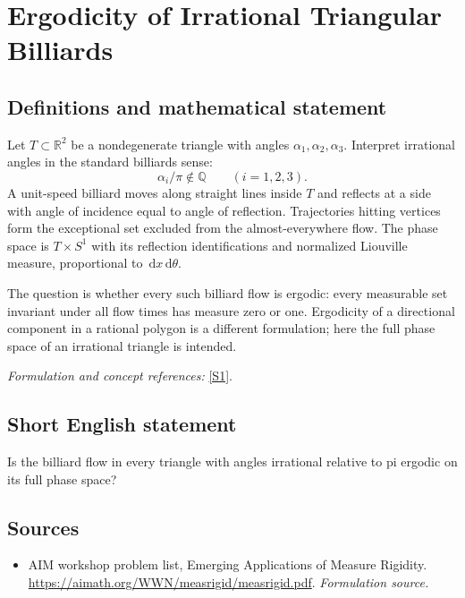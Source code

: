 \documentclass[11pt]{article}
\begin{document}
\section*{\texorpdfstring{Ergodicity of Irrational Triangular Billiards}{Ergodicity of Irrational Triangular Billiards}}\label{454}
\subsection{Definitions and mathematical statement}
Let $T\subset{\mathbb{R}}^2$ be a nondegenerate triangle with angles $\alpha_1,\alpha_2,\alpha_3$. Interpret irrational angles in the standard billiards sense:
\[
 \alpha_i/\pi\notin{\mathbb{Q}}\qquad(i=1,2,3).
\]
A unit-speed billiard moves along straight lines inside $T$ and reflects at a side with angle of incidence equal to angle of reflection. Trajectories hitting vertices form the exceptional set excluded from the almost-everywhere flow. The phase space is $T\times S^1$ with its reflection identifications and normalized Liouville measure, proportional to ${\,\mathrm{d}} x{\,\mathrm{d}}\theta$.

The question is whether every such billiard flow is ergodic: every measurable set invariant under all flow times has measure zero or one. Ergodicity of a directional component in a rational polygon is a different formulation; here the full phase space of an irrational triangle is intended.
\par\smallskip\textit{Formulation and concept references:} \href{https://aimath.org/WWN/measrigid/measrigid.pdf}{[S1]}.

\subsection{Short English statement}
Is the billiard flow in every triangle with angles irrational relative to pi ergodic on its full phase space?
\subsection{Sources}
\begin{itemize}
\item[S1]AIM workshop problem list, Emerging Applications of Measure Rigidity.
\url{https://aimath.org/WWN/measrigid/measrigid.pdf}.
\textit{Formulation source.}
\end{itemize}
\end{document}
